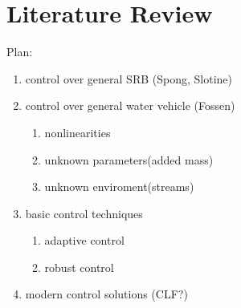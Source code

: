 \chapter{Literature Review}

Plan:
\begin{enumerate}
    \item control over general SRB (Spong, Slotine)
    \item control over general water vehicle (Fossen)
        \begin{enumerate}
            \item nonlinearities
            \item unknown parameters(added mass)
            \item unknown enviroment(streams)
        \end{enumerate}
    \item basic control techniques
        \begin{enumerate}
            \item adaptive control
            \item robust control
        \end{enumerate}
    \item modern control solutions (CLF?)
\end{enumerate}